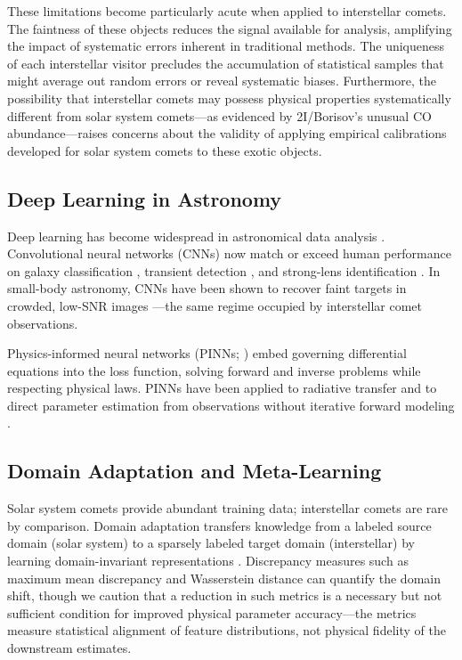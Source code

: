 \documentclass[preprint2]{aastex631}
\begin{document}
These limitations become particularly acute when applied to interstellar comets. The faintness of these objects reduces the signal available for analysis, amplifying the impact of systematic errors inherent in traditional methods. The uniqueness of each interstellar visitor precludes the accumulation of statistical samples that might average out random errors or reveal systematic biases. Furthermore, the possibility that interstellar comets may possess physical properties systematically different from solar system comets---as evidenced by 2I/Borisov's unusual CO abundance---raises concerns about the validity of applying empirical calibrations developed for solar system comets to these exotic objects.

\subsection{Deep Learning in Astronomy}

Deep learning has become widespread in astronomical data analysis \citep{baron19}. Convolutional neural networks (CNNs) now match or exceed human performance on galaxy classification \citep{dieleman15}, transient detection \citep{goldstein15}, and strong-lens identification \citep{lanusse18}. In small-body astronomy, CNNs have been shown to recover faint targets in crowded, low-SNR images \citep{jiang23}---the same regime occupied by interstellar comet observations.

Physics-informed neural networks (PINNs; \citealt{raissi19}) embed governing differential equations into the loss function, solving forward and inverse problems while respecting physical laws. PINNs have been applied to radiative transfer \citep{mishra21,biswal25} and to direct parameter estimation from observations without iterative forward modeling \citep{lu21}.

\subsection{Domain Adaptation and Meta-Learning}

Solar system comets provide abundant training data; interstellar comets are rare by comparison. Domain adaptation transfers knowledge from a labeled source domain (solar system) to a sparsely labeled target domain (interstellar) by learning domain-invariant representations \citep{daume09,ganin16}. Discrepancy measures such as maximum mean discrepancy \citep{gretton12} and Wasserstein distance \citep{arjovsky17} can quantify the domain shift, though we caution that a reduction in such metrics is a necessary but not sufficient condition for improved physical parameter accuracy---the metrics measure statistical alignment of feature distributions, not physical fidelity of the downstream estimates.
\end{document}
